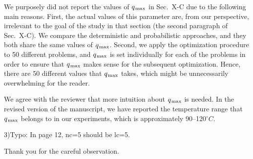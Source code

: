\begin{authors}
We purposely did not report the values of $q_{\text{\kern0.1emmax}}$ in Sec.~X-C due to the
following main reasons. First, the actual values of this parameter are, from our
perspective, irrelevant to the goal of the study in that section (the second
paragraph of Sec.~X-C). We compare the deterministic and probabilistic
approaches, and they both share the same values of $q_{\text{\kern0.1emmax}}$. Second, we
apply the optimization procedure to 50 different problems, and $q_{\text{\kern0.1emmax}}$ is
set individually for each of the problems in order to ensure that $q_{\text{\kern0.1emmax}}$
makes sense for the subsequent optimization. Hence, there are 50 different
values that $q_{\text{\kern0.1emmax}}$ takes, which might be unnecessarily overwhelming for
the reader.

We agree with the reviewer that more intuition about $q_{\text{\kern0.1emmax}}$ is needed.
In the revised version of the manuscript, we have reported the temperature range
that $q_{\text{\kern0.1emmax}}$ belongs to in our experiments, which is approximately
90--120${}^\circ{}C$.

\begin{actions}
\end{actions}
\end{authors}

\begin{reviewer}
3)Typo: In page 12, nc=5 should be lc=5.
\end{reviewer}

\begin{authors}
  Thank you for the careful observation.

\begin{actions}
\end{actions}
\end{authors}
